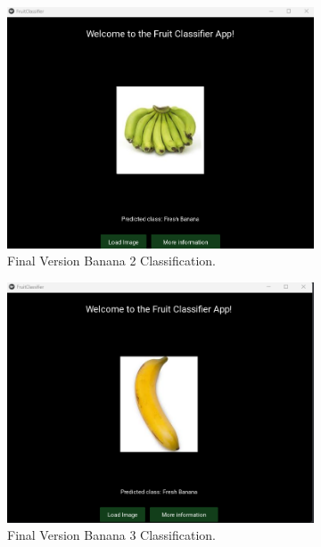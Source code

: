 \documentclass[conference]{IEEEtran}
\begin{document}
\begin{figure}[h]
\begin{subfigure}[b]{0.48\linewidth}
        \centering
        \includegraphics[width=\linewidth]{Mlayer banana2.png}
        \caption{Final Version Banana 2 Classification.}
        \label{figFB}
    \end{subfigure}
    \hfill
    \begin{subfigure}[b]{0.48\linewidth}
        \centering
        \includegraphics[width=\linewidth]{Mlayer banana3.png}
        \caption{Final Version Banana 3 Classification.}
        \label{figFB}
    \end{subfigure}
    \hfill
    \begin{subfigure}[b]{0.48\linewidth}
        \centering

\end{subfigure}
\end{figure}
\end{document}
